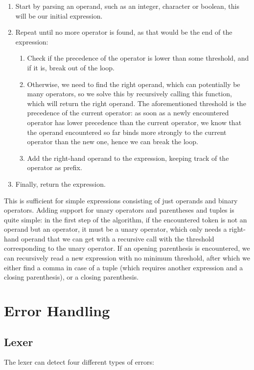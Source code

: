 \begin{enumerate}
    \item Start by parsing an operand, such as an integer, character or boolean, this will be our initial expression.
    \item Repeat until no more operator is found, as that would be the end of the expression:
    \begin{enumerate}
        \item Check if the precedence of the operator is lower than some threshold, and if it is, break out of the loop.
        \item Otherwise, we need to find the right operand, which can potentially be many operators, so we solve this by recursively calling this function, which will return the right operand. The aforementioned threshold is the precedence of the current operator: as soon as a newly encountered operator has lower precedence than the current operator, we know that the operand encountered so far binds more strongly to the current operator than the new one, hence we can break the loop.
        \item Add the right-hand operand to the expression, keeping track of the operator as prefix.
    \end{enumerate}
    \item Finally, return the expression.
\end{enumerate}

This is sufficient for simple expressions consisting of just operands and binary operators. Adding support for unary operators and parentheses and tuples is quite simple: in the first step of the algorithm, if the encountered token is not an operand but an operator, it must be a unary operator, which only needs a right-hand operand that we can get with a recursive call with the threshold corresponding to the unary operator. If an opening parenthesis is encountered, we can recursively read a new expression with no minimum threshold, after which we either find a comma in case of a tuple (which requires another expression and a closing parenthesis), or a closing parenthesis.

\section{Error Handling}

\subsection{Lexer}
The lexer can detect four different types of errors:

